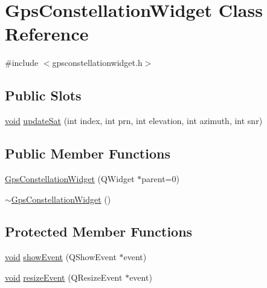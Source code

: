 \hypertarget{class_gps_constellation_widget}{\section{\-Gps\-Constellation\-Widget \-Class \-Reference}
\label{class_gps_constellation_widget}
}


{\ttfamily \#include $<$gpsconstellationwidget.\-h$>$}

\subsection*{\-Public \-Slots}
\begin{DoxyCompactItemize}
\item 
\hyperlink{group___u_a_v_objects_plugin_ga444cf2ff3f0ecbe028adce838d373f5c}{void} \hyperlink{group___g_p_s_gadget_plugin_gaa995e2d09a888698ad0aae9ba0a91ebf}{update\-Sat} (int index, int prn, int elevation, int azimuth, int snr)
\end{DoxyCompactItemize}
\subsection*{\-Public \-Member \-Functions}
\begin{DoxyCompactItemize}
\item 
\hyperlink{group___g_p_s_gadget_plugin_gaa8d0d3435153893cbf167a1e5820d979}{\-Gps\-Constellation\-Widget} (\-Q\-Widget $\ast$parent=0)
\item 
\hyperlink{group___g_p_s_gadget_plugin_gaa4c124f26c71bf318147e079011fe137}{$\sim$\-Gps\-Constellation\-Widget} ()
\end{DoxyCompactItemize}
\subsection*{\-Protected \-Member \-Functions}
\begin{DoxyCompactItemize}
\item 
\hyperlink{group___u_a_v_objects_plugin_ga444cf2ff3f0ecbe028adce838d373f5c}{void} \hyperlink{group___g_p_s_gadget_plugin_ga6b206d00a88aa90134aba5ca815355a9}{show\-Event} (\-Q\-Show\-Event $\ast$event)
\item 
\hyperlink{group___u_a_v_objects_plugin_ga444cf2ff3f0ecbe028adce838d373f5c}{void} \hyperlink{group___g_p_s_gadget_plugin_ga33f2f0f0eba2737a2917b206fda14a11}{resize\-Event} (\-Q\-Resize\-Event $\ast$event)
\end{DoxyCompactItemize}


